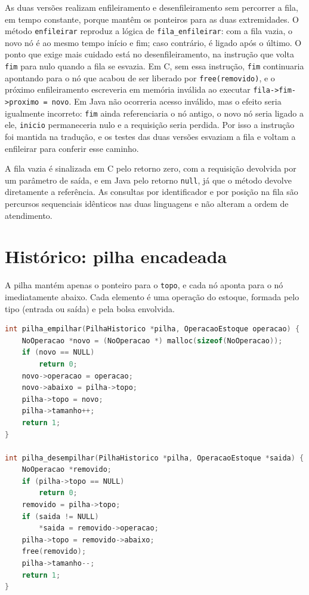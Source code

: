 \documentclass[12pt,a4paper,oneside]{report}
\newcommand{\fonte}[1][Elaborado pelos autores (2026).]{\par\vspace{2pt}{\centering\small Fonte: #1\par}\vspace{6pt}}
\newcommand{\cod}[1]{\texttt{#1}}
\begin{document}
As duas versões realizam enfileiramento e desenfileiramento sem percorrer a fila, em tempo constante, porque mantêm os ponteiros para as duas extremidades. O método \cod{enfileirar} reproduz a lógica de \cod{fila\_enfileirar}: com a fila vazia, o novo nó é ao mesmo tempo início e fim; caso contrário, é ligado após o último. O ponto que exige mais cuidado está no desenfileiramento, na instrução que volta \cod{fim} para nulo quando a fila se esvazia. Em C, sem essa instrução, \cod{fim} continuaria apontando para o nó que acabou de ser liberado por \cod{free(removido)}, e o próximo enfileiramento escreveria em memória inválida ao executar \cod{fila->fim->proximo = novo}. Em Java não ocorreria acesso inválido, mas o efeito seria igualmente incorreto: \cod{fim} ainda referenciaria o nó antigo, o novo nó seria ligado a ele, \cod{inicio} permaneceria nulo e a requisição seria perdida. Por isso a instrução foi mantida na tradução, e os testes das duas versões esvaziam a fila e voltam a enfileirar para conferir esse caminho.

A fila vazia é sinalizada em C pelo retorno zero, com a requisição devolvida por um parâmetro de saída, e em Java pelo retorno \cod{null}, já que o método devolve diretamente a referência. As consultas por identificador e por posição na fila são percursos sequenciais idênticos nas duas linguagens e não alteram a ordem de atendimento.

\section{Histórico: pilha encadeada}

A pilha mantém apenas o ponteiro para o \cod{topo}, e cada nó aponta para o nó imediatamente abaixo. Cada elemento é uma operação do estoque, formada pelo tipo (entrada ou saída) e pela bolsa envolvida.

\begin{lstlisting}[language=C,caption={Empilhar e desempilhar operações, em C (\cod{pilha\_historico.c})},label=cod:pilha-c]
int pilha_empilhar(PilhaHistorico *pilha, OperacaoEstoque operacao) {
    NoOperacao *novo = (NoOperacao *) malloc(sizeof(NoOperacao));
    if (novo == NULL)
        return 0;
    novo->operacao = operacao;
    novo->abaixo = pilha->topo;
    pilha->topo = novo;
    pilha->tamanho++;
    return 1;
}

int pilha_desempilhar(PilhaHistorico *pilha, OperacaoEstoque *saida) {
    NoOperacao *removido;
    if (pilha->topo == NULL)
        return 0;
    removido = pilha->topo;
    if (saida != NULL)
        *saida = removido->operacao;
    pilha->topo = removido->abaixo;
    free(removido);
    pilha->tamanho--;
    return 1;
}
\end{lstlisting}
\fonte
\end{document}
